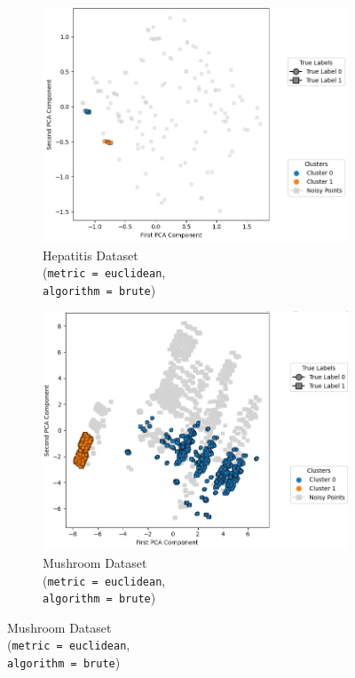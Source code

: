 \begin{figure}[H]
	\centering
	\begin{subfigure}{0.32\textwidth}
		\centering
		\includegraphics[width=\linewidth]{figures/Optics/hepatitis/br-pca.png}
		\caption{Hepatitis Dataset \\ (\texttt{metric = euclidean}, \\ \texttt{algorithm = brute})}
	\end{subfigure}
	\hfill
	\begin{subfigure}{0.32\textwidth}
		\centering
		\includegraphics[width=\linewidth]{figures/Optics/mushroom/br-pca.png}
		\caption{Mushroom Dataset \\ (\texttt{metric = euclidean}, \\ \texttt{algorithm = brute})}

\end{subfigure}
\end{figure}
